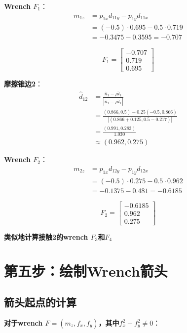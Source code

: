 \documentclass[12pt,a4paper]{article}
\begin{document}
\textbf{Wrench $F_1$}：
\begin{align}
m_{1z} &= p_{1x} d_{11y} - p_{1y} d_{11x} \\
&= (-0.5) \cdot 0.695 - 0.5 \cdot 0.719 \\
&= -0.3475 - 0.3595 = -0.707
\end{align}

\begin{equation}
F_1 = \begin{bmatrix} -0.707 \\ 0.719 \\ 0.695 \end{bmatrix}
\end{equation}

\textbf{摩擦锥边2}：
\begin{align}
\hat{d}_{12} &= \frac{\hat{n}_1 - \mu \hat{t}_1}{|\hat{n}_1 - \mu \hat{t}_1|} \\
&= \frac{(0.866, 0.5) - 0.25(-0.5, 0.866)}{|(0.866 + 0.125, 0.5 - 0.217)|} \\
&= \frac{(0.991, 0.283)}{1.030} \\
&\approx (0.962, 0.275)
\end{align}

\textbf{Wrench $F_2$}：
\begin{align}
m_{2z} &= p_{1x} d_{12y} - p_{1y} d_{12x} \\
&= (-0.5) \cdot 0.275 - 0.5 \cdot 0.962 \\
&= -0.1375 - 0.481 = -0.6185
\end{align}

\begin{equation}
F_2 = \begin{bmatrix} -0.6185 \\ 0.962 \\ 0.275 \end{bmatrix}
\end{equation}

\textbf{类似地计算接触2的wrench $F_3$和$F_4$}

\section{第五步：绘制Wrench箭头}

\subsection{箭头起点的计算}

\textbf{对于wrench $F = (m_z, f_x, f_y)$，其中$f_x^2 + f_y^2 \neq 0$}：
\end{document}
